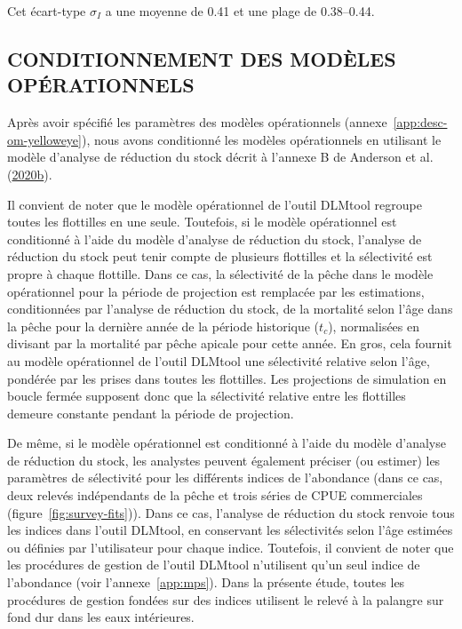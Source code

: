 \documentclass[french,11pt]{book}
\begin{document}
Cet écart-type \(\sigma_I\) a une moyenne de 0.41 et une plage de 0.38--0.44.

\hypertarget{sec:approach3-conditioning}{%
\subsection{CONDITIONNEMENT DES MODÈLES OPÉRATIONNELS}\label{sec:approach3-conditioning}}

Après avoir spécifié les paramètres des modèles opérationnels (annexe~\ref{app:desc-om-yelloweye}), nous avons conditionné les modèles opérationnels en utilisant le modèle d'analyse de réduction du stock décrit à l'annexe B de Anderson et al. (\protect\hyperlink{ref-anderson2020gfmp}{2020b}).

Il convient de noter que le modèle opérationnel de l'outil DLMtool regroupe toutes les flottilles en une seule. Toutefois, si le modèle opérationnel est conditionné à l'aide du modèle d'analyse de réduction du stock, l'analyse de réduction du stock peut tenir compte de plusieurs flottilles et la sélectivité est propre à chaque flottille. Dans ce cas, la sélectivité de la pêche dans le modèle opérationnel pour la période de projection est remplacée par les estimations, conditionnées par l'analyse de réduction du stock, de la mortalité selon l'âge dans la pêche pour la dernière année de la période historique (\(t_c\)), normalisées en divisant par la mortalité par pêche apicale pour cette année. En gros, cela fournit au modèle opérationnel de l'outil DLMtool une sélectivité relative selon l'âge, pondérée par les prises dans toutes les flottilles. Les projections de simulation en boucle fermée supposent donc que la sélectivité relative entre les flottilles demeure constante pendant la période de projection.

De même, si le modèle opérationnel est conditionné à l'aide du modèle d'analyse de réduction du stock, les analystes peuvent également préciser (ou estimer) les paramètres de sélectivité pour les différents indices de l'abondance (dans ce cas, deux relevés indépendants de la pêche et trois séries de CPUE commerciales (figure~\ref{fig:survey-fits})). Dans ce cas, l'analyse de réduction du stock renvoie tous les indices dans l'outil DLMtool, en conservant les sélectivités selon l'âge estimées ou définies par l'utilisateur pour chaque indice. Toutefois, il convient de noter que les procédures de gestion de l'outil DLMtool n'utilisent qu'un seul indice de l'abondance (voir l'annexe~\ref{app:mps}). Dans la présente étude, toutes les procédures de gestion fondées sur des indices utilisent le relevé à la palangre sur fond dur dans les eaux intérieures.
\end{document}
